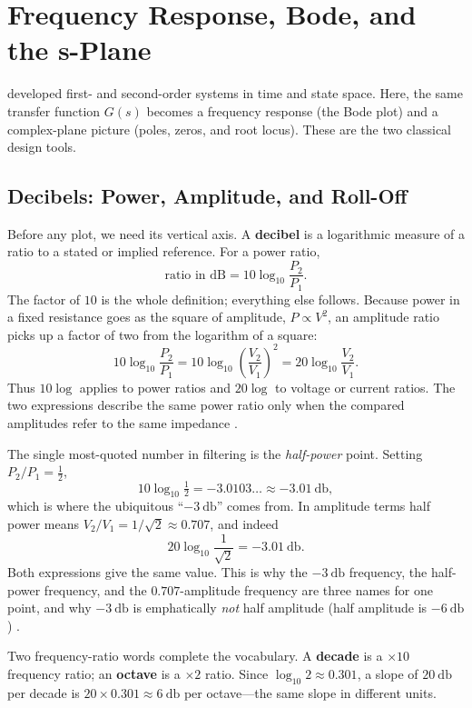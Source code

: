 \chapter{Frequency Response, Bode, and the s-Plane}
\label{ch:splane}
 developed first- and second-order systems in time and state
space. Here, the same transfer function \(G(s)\) becomes a frequency response
(the Bode plot) and a complex-plane picture (poles, zeros, and root locus).
These are the two classical design tools.

\section{Decibels: Power, Amplitude, and Roll-Off}
\label{sec:decibels}
Before any plot, we need its vertical axis. A \textbf{decibel} is a logarithmic
measure of a ratio to a stated or implied reference. For a power ratio,
\[
\text{ratio in dB}=10\log_{10}\frac{P_2}{P_1}.
\]
The factor of \(10\) is the whole definition; everything else follows. Because
power in a fixed resistance goes as the square of amplitude, \(P\propto V^2\), an
amplitude ratio picks up a factor of two from the logarithm of a square:
\[
10\log_{10}\frac{P_2}{P_1}
=10\log_{10}\left(\frac{V_2}{V_1}\right)^{\!2}
=20\log_{10}\frac{V_2}{V_1}.
\]
Thus \(10\log\) applies to power ratios and \(20\log\) to voltage or current
ratios. The two expressions describe the same power ratio only when the compared
amplitudes refer to the same impedance
\cite[pp.~33--37]{white2004highfrequency}.

\begin{workedbox}
The single most-quoted number in filtering is the \emph{half-power} point. Setting
\(P_2/P_1=\tfrac12\),
\[
10\log_{10}\tfrac12=-3.0103\ldots\approx-\SI{3.01}{\decibel},
\]
which is where the ubiquitous ``\(-\SI{3}{\decibel}\)'' comes from. In amplitude
terms half power means \(V_2/V_1=1/\sqrt2\approx0.707\), and indeed
\[
20\log_{10}\frac{1}{\sqrt2}=-\SI{3.01}{\decibel}.
\]
Both expressions give the same value. This is why the \(-\SI{3}{\decibel}\)
frequency, the half-power frequency, and the \(0.707\)-amplitude frequency are
three names for one point, and why \(-\SI{3}{\decibel}\) is emphatically \emph{not}
half amplitude (half amplitude is \(-\SI{6}{\decibel}\))
\cite[pp.~33--37]{white2004highfrequency}.
\end{workedbox}

Two frequency-ratio words complete the vocabulary. A \textbf{decade} is a
\(\times10\) frequency ratio; an \textbf{octave} is a \(\times2\) ratio. Since
\(\log_{10}2\approx0.301\), a slope of \(\SI{20}{\decibel}\) per decade is
\(20\times0.301\approx\SI{6}{\decibel}\) per octave---the same slope in different
units.

